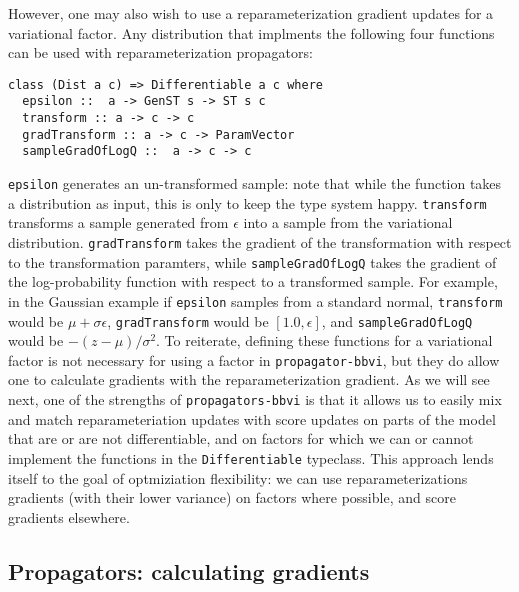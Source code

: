 \documentclass[12pt]{article}
\begin{document}
However, one may also wish to use a reparameterization gradient
updates \citep{kuc-2017} for a variational factor. Any distribution
that implments the following four functions can be used with
reparameterization propagators:

\begin{verbatim}
class (Dist a c) => Differentiable a c where
  epsilon ::  a -> GenST s -> ST s c
  transform :: a -> c -> c
  gradTransform :: a -> c -> ParamVector
  sampleGradOfLogQ ::  a -> c -> c
\end{verbatim}

\texttt{epsilon} generates an un-transformed sample: note that while
the function takes a distribution as input, this is only to keep the
type system happy. \texttt{transform} transforms a sample generated
from $\epsilon$ into a sample from the variational
distribution. \texttt{gradTransform} takes the gradient of the
transformation with respect to the transformation paramters, while
\texttt{sampleGradOfLogQ} takes the gradient of the log-probability
function with respect to a transformed sample. For example, in the
Gaussian example if \texttt{epsilon} samples from a standard normal,
\texttt{transform} would be $\mu + \sigma \epsilon$,
\texttt{gradTransform} would be $[1.0, \epsilon]$, and
\texttt{sampleGradOfLogQ} would be $-(z - \mu) / \sigma ^ 2$. To
reiterate, defining these functions for a variational factor is not
necessary for using a factor in \texttt{propagator-bbvi}, but they do
allow one to calculate gradients with the reparameterization
gradient. As we will see next, one of the strengths of
\texttt{propagators-bbvi} is that it allows us to easily mix and match
reparameteriation updates with score updates on parts of the model
that are or are not differentiable, and on factors for which we can or
cannot implement the functions in the \texttt{Differentiable}
typeclass. This approach lends itself to the goal of optmiziation
flexibility: we can use reparameterizations gradients (with their
lower variance) on factors where possible, and score gradients
elsewhere.

\subsection{Propagators: calculating gradients}
\end{document}
